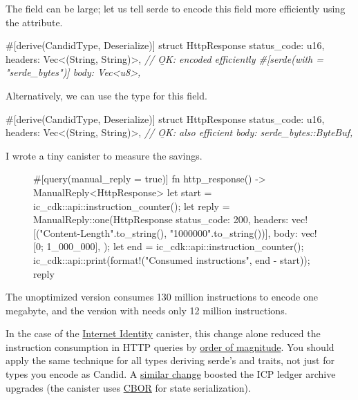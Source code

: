 \documentclass{article}
\begin{document}
The  field can be large; let us tell serde to encode this field more efficiently using the \href{https://serde.rs/field-attrs.html#with}{} attribute.

\begin{code}[good]
#[derive(CandidType, Deserialize)]
struct HttpResponse {
    status_code: u16,
    headers: Vec<(String, String)>,
    \em{// \b{OK}: encoded efficiently}
    #[serde(with = "serde_bytes")]
    body: Vec<u8>,
}
\end{code}

Alternatively, we can use the \href{https://docs.serde.rs/serde_bytes/struct.ByteBuf.html}{} type for this field.

\begin{code}[good]
#[derive(CandidType, Deserialize)]
struct HttpResponse {
    status_code: u16,
    headers: Vec<(String, String)>,
    \em{// \b{OK}: also efficient}
    body: serde_bytes::ByteBuf,
}
\end{code}

I wrote a tiny canister to measure the savings.

\begin{figure}
\begin{code}[rust]
#[query(manual_reply = true)]
fn http_response() -> ManualReply<HttpResponse> {
    let start = ic_cdk::api::instruction_counter();
    let reply = ManualReply::one(HttpResponse {
        status_code: 200,
        headers: vec![("Content-Length".to_string(), "1000000".to_string())],
        body: vec![0; 1_000_000],
    });
    let end = ic_cdk::api::instruction_counter();
    ic_cdk::api::print(format!("Consumed {} instructions", end - start));
    reply
}
\end{code}
\end{figure}

The unoptimized version consumes 130 million instructions to encode one megabyte, and the version with  needs only 12 million instructions.

In the case of the \href{https://github.com/dfinity/internet-identity/}{Internet Identity} canister, this change alone reduced the instruction consumption in HTTP queries by \href{https://github.com/dfinity/internet-identity/pull/184}{order of magnitude}.
You should apply the same technique for all types deriving serde's  and  traits, not just for types you encode as Candid.
A \href{https://github.com/dfinity/ic/commit/1b98a5d984176b1c948d0cb92227d88ad5ee8044}{similar change} boosted the ICP ledger archive upgrades (the canister uses \href{https://cbor.io}{CBOR} for state serialization).
\end{document}

